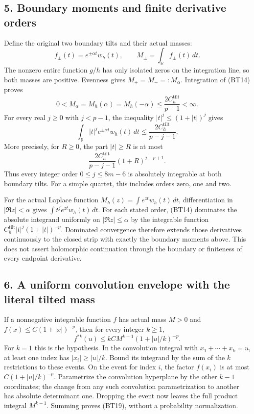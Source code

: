 \documentclass[11pt,a4paper]{article}
\begin{document}
\subsection{5. Boundary moments and finite derivative orders}\label{boundary-moments-and-finite-derivative-orders}

Define the original two boundary tilts and their actual masses: \[
f_\pm(t)=e^{\pm\alpha t}w_h(t),\qquad
M_\pm=\int_{\mathbb R}f_\pm(t)\,dt.
\tag{BT15}
\] The nonzero entire function \(g/h\) has only isolated zeros on the integration line, so both masses are positive. Evenness gives \(M_+=M_-=:M_\alpha\). Integration of (BT14) proves \[
\boxed{
0<M_\alpha=M_h(\alpha)=M_h(-\alpha)
\le\frac{2C_h^{\mathrm{tilt}}}{p-1}<\infty.}
\tag{BT16}
\] For every real \(j\ge0\) with \(j<p-1\), the inequality \(|t|^j\le(1+|t|)^j\) gives \[
\int_{\mathbb R}|t|^j e^{\pm\alpha t}w_h(t)\,dt
\le\frac{2C_h^{\mathrm{tilt}}}{p-j-1}.
\tag{BT17}
\] More precisely, for \(R\ge0\), the part \(|t|\ge R\) is at most \[
\frac{2C_h^{\mathrm{tilt}}}{p-j-1}
(1+R)^{j-p+1}.
\tag{BT18}
\] Thus every integer order \(0\le j\le8m-6\) is absolutely integrable at both boundary tilts. For a simple quartet, this includes orders zero, one and two.

For the actual Laplace function \(M_h(z)=\int e^{zt}w_h(t)\,dt\), differentiation in \(|\Re z|<\alpha\) gives \(\int t^j e^{zt}w_h(t)\,dt\). For each stated order, (BT14) dominates the absolute integrand uniformly on \(|\Re z|\le\alpha\) by the integrable function \(C_h^{\mathrm{tilt}}|t|^j(1+|t|)^{-p}\). Dominated convergence therefore extends those derivatives continuously to the closed strip with exactly the boundary moments above. This does not assert holomorphic continuation through the boundary or finiteness of every endpoint derivative.

\subsection{6. A uniform convolution envelope with the literal tilted mass}\label{a-uniform-convolution-envelope-with-the-literal-tilted-mass}

If a nonnegative integrable function \(f\) has actual mass \(M>0\) and \(f(x)\le C(1+|x|)^{-p}\), then for every integer \(k\ge1\), \[
\boxed{
f^{*k}(u)\le kCM^{k-1}(1+|u|/k)^{-p}.}
\tag{BT19}
\] For \(k=1\) this is the hypothesis. In the convolution integral with \(x_1+\cdots+x_k=u\), at least one index has \(|x_i|\ge|u|/k\). Bound its integrand by the sum of the \(k\) restrictions to these events. On the event for index \(i\), the factor \(f(x_i)\) is at most \(C(1+|u|/k)^{-p}\). Parametrize the convolution hyperplane by the other \(k-1\) coordinates; the change from any such convolution parametrization to another has absolute determinant one. Dropping the event now leaves the full product integral \(M^{k-1}\). Summing proves (BT19), without a probability normalization.
\end{document}
